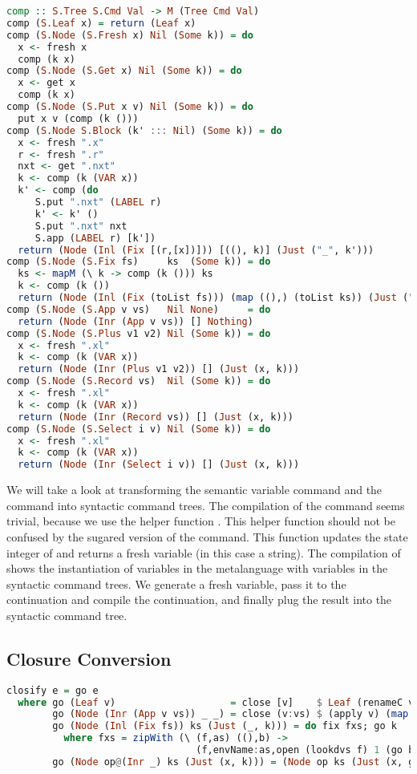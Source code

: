 \begin{lstlisting}[language=Haskell]
comp :: S.Tree S.Cmd Val -> M (Tree Cmd Val)
comp (S.Leaf x) = return (Leaf x)
comp (S.Node (S.Fresh x) Nil (Some k)) = do
  x <- fresh x
  comp (k x)
comp (S.Node (S.Get x) Nil (Some k)) = do
  x <- get x
  comp (k x)
comp (S.Node (S.Put x v) Nil (Some k)) = do
  put x v (comp (k ()))
comp (S.Node S.Block (k' ::: Nil) (Some k)) = do
  x <- fresh ".x"
  r <- fresh ".r"
  nxt <- get ".nxt"
  k <- comp (k (VAR x))
  k' <- comp (do
     S.put ".nxt" (LABEL r)
     k' <- k' ()
     S.put ".nxt" nxt
     S.app (LABEL r) [k'])
  return (Node (Inl (Fix [(r,[x])])) [((), k)] (Just ("_", k')))
comp (S.Node (S.Fix fs)     ks  (Some k)) = do
  ks <- mapM (\ k -> comp (k ())) ks
  k <- comp (k ())
  return (Node (Inl (Fix (toList fs))) (map ((),) (toList ks)) (Just ("_", k)))
comp (S.Node (S.App v vs)   Nil None)     = do
  return (Node (Inr (App v vs)) [] Nothing)
comp (S.Node (S.Plus v1 v2) Nil (Some k)) = do
  x <- fresh ".xl"
  k <- comp (k (VAR x))
  return (Node (Inr (Plus v1 v2)) [] (Just (x, k)))
comp (S.Node (S.Record vs)  Nil (Some k)) = do
  x <- fresh ".xl"
  k <- comp (k (VAR x))
  return (Node (Inr (Record vs)) [] (Just (x, k)))
comp (S.Node (S.Select i v) Nil (Some k)) = do
  x <- fresh ".xl"
  k <- comp (k (VAR x))
  return (Node (Inr (Select i v)) [] (Just (x, k)))
\end{lstlisting}

We will take a look at transforming the semantic  variable command and the  command into syntactic command trees. The compilation of the  command seems trivial, because we use the helper function . This helper function should not be confused by the sugared version of the  command. This function updates the state integer of  and returns a fresh variable (in this case a string). The compilation of  shows the instantiation of variables in the metalanguage with variables in the syntactic command trees. We generate a fresh variable, pass it to the continuation and compile the continuation, and finally plug the result into the syntactic command tree.

\subsection{\label{subsection:closconvert2}Closure Conversion}
\begin{lstlisting}[language=Haskell]
closify e = go e
  where go (Leaf v)                    = close [v]    $ Leaf (renameC v)
        go (Node (Inr (App v vs)) _ _) = close (v:vs) $ (apply v) (map renameC vs)
        go (Node (Inl (Fix fs)) ks (Just (_, k))) = do fix fxs; go k
          where fxs = zipWith (\ (f,as) ((),b) ->
                                 (f,envName:as,open (lookdvs f) 1 (go b))) fs ks
        go (Node op@(Inr _) ks (Just (x, k))) = (Node op ks (Just (x, go k)))
\end{lstlisting}

